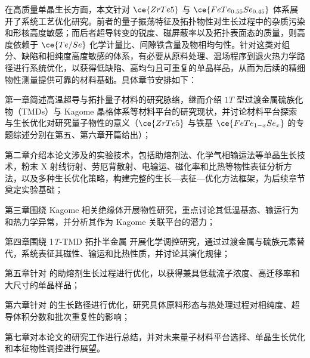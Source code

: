 在高质量单晶生长方面，本文针对 $\ce{ZrTe5}$ 与 $\ce{FeTe_{0.55}Se_{0.45}}$ 体系展开了系统工艺优化研究。前者的量子振荡特征及拓扑物性对生长过程中的杂质污染和形核高度敏感；而后者超导转变的锐度、磁屏蔽率以及拓扑表面态的质量，则高度依赖于 $\ce{Te/Se}$ 化学计量比、间隙铁含量及物相均匀性。针对这类对组分、缺陷和相纯度高度敏感的体系，有必要从原料处理、温场程序到退火热力学路径进行系统优化，以获得低缺陷、高均匀且可重复的单晶样品，从而为后续的精细物性测量提供可靠的材料基础。具体章节安排如下：

第一章简述高温超导与拓扑量子材料的研究脉络，继而介绍 $1T$ 型过渡金属硫族化物（TMDs）与 Kagome 晶格体系等材料平台的研究现状，并讨论材料平台探索与生长优化对研究量子物性的意义（$\ce{ZrTe5}$ 与铁基 $\ce{FeTe_{1-x}Se_x}$ 的专题综述分别在第五、第六章开篇给出）；

第二章介绍本论文涉及的实验技术，包括助熔剂法、化学气相输运法等单晶生长技术，粉末 X 射线衍射、劳厄背散射、电输运、磁化率和比热等物性表征分析方法，以及多种生长优化策略，构建完整的生长—表征—优化方法框架，为后续章节奠定实验基础；

第三章围绕 Kagome 相关绝缘体开展物性研究，重点讨论其低温基态、输运行为和热力学异常，并分析其作为 Kagome 关联平台的潜力；

第四章围绕 1\textit{T}-TMD 拓扑半金属  开展化学调控研究，通过过渡金属与硫族元素替代，系统表征其磁性、输运和比热性质，并讨论其演化规律；

第五章针对  的助熔剂生长过程进行优化，以获得兼具低载流子浓度、高迁移率和大尺寸的单晶样品；

第六章针对  的生长路径进行优化，研究具体原料形态与热处理过程对相纯度、超导体积分数和批次重复性的影响；

第七章对本论文的研究工作进行总结，并对未来量子材料平台选择、单晶生长优化和本征物性调控进行展望。



